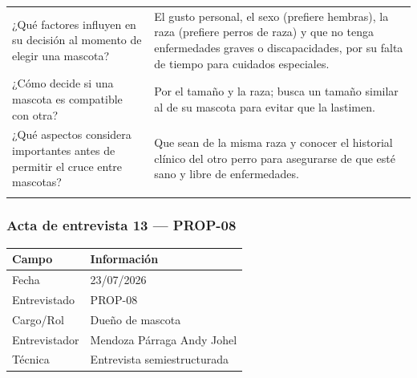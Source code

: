 \documentclass[journal,onecolumn]{IEEEtran}
\begin{document}
{\begin{longtable}{@{}p{5.6cm} p{9.4cm}@{}}
			¿Qué factores influyen en su decisión al momento de elegir una mascota? & El gusto personal, el sexo (prefiere hembras), la raza (prefiere perros de raza) y que no tenga enfermedades graves o discapacidades, por su falta de tiempo para cuidados especiales. \\ \addlinespace
			
			¿Cómo decide si una mascota es compatible con otra? & Por el tamaño y la raza; busca un tamaño similar al de su mascota para evitar que la lastimen. \\ \addlinespace
			
			¿Qué aspectos considera importantes antes de permitir el cruce entre mascotas? & Que sean de la misma raza y conocer el historial clínico del otro perro para asegurarse de que esté sano y libre de enfermedades. \\ \addlinespace
			
		\end{longtable}
	}
	
	
	\subsubsection*{Acta de entrevista 13 --- PROP-08}
	
	\begin{table}[H]
		\centering\small
		\begin{tabularx}{\textwidth}{@{}l X@{}}
			\toprule
			\textbf{Campo} & \textbf{Información} \\
			\midrule
			
			Fecha & 23/07/2026 \\
			
			Entrevistado & PROP-08 \\
			
			Cargo/Rol & Dueño de mascota \\
			
			Entrevistador & Mendoza Párraga Andy Johel \\
			
			Técnica & Entrevista semiestructurada \\
			
			\bottomrule
		\end{tabularx}
	\end{table}
	
\end{document}
